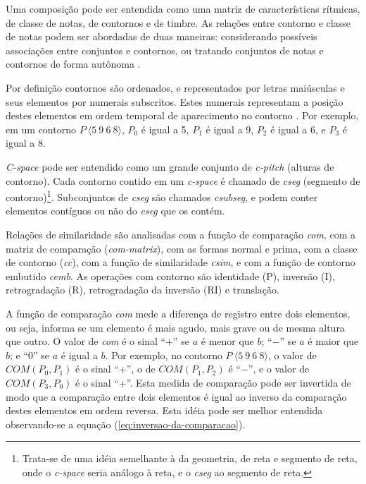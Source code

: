 \documentclass[brazil]{article}
\newcommand{\eng}[1]{\textit{#1}}
\begin{document}
Uma composição pode ser entendida como uma matriz de características
rítmicas, de classe de notas, de contornos e de timbre. As relações
entre contorno e classe de notas podem ser abordadas de duas maneiras:
considerando possíveis associações entre conjuntos e contornos, ou
tratando conjuntos de notas e contornos de forma autônoma
\cite{friedmann85:methodology}.

Por definição contornos são ordenados, e representados por letras
maiúsculas e seus elementos por numerais subscritos. Estes numerais
representam a posição destes elementos em ordem temporal de
aparecimento no contorno \cite{marvin.ea87:relating}. Por exemplo, em
um contorno $P\:\langle5\:9\:6\:8\rangle$, $P_0$ é igual a 5, $P_1$ é
igual a 9, $P_2$ é igual a 6, e $P_3$ é igual a 8.

\eng{C-space} pode ser entendido como um grande conjunto de
\eng{c-pitch} (alturas de contorno). Cada contorno contido em um
\eng{c-space} é chamado de \eng{cseg} (segmento de
contorno)\footnote{Trata-se de uma idéia semelhante à da geometria, de
  reta e segmento de reta, onde o \eng{c-space} seria análogo à reta,
  e o \eng{cseg} ao segmento de reta.}. Subconjuntos de \eng{cseg} são
chamados \eng{csubseg}, e podem conter elementos contíguos ou não do
\eng{cseg} que os contém.

Relações de similaridade \cite{marvin.ea87:relating} são analisadas
com a função de comparação \eng{com}, com a matriz de comparação
(\eng{com-matrix}), com as formas normal e prima, com a classe de
contorno (\eng{cc}), com a função de similaridade \eng{csim}, e com a
função de contorno embutido \eng{cemb}. As operações com contorno são
identidade (P), inversão (I), retrogradação (R), retrogradação da
inversão (RI) e translação.

A função de comparação \eng{com} mede a diferença de registro entre
dois elementos, ou seja, informa se um elemento é mais agudo, mais
grave ou de mesma altura que outro. O valor de \eng{com} é o sinal
``$+$'' se $a$ é menor que $b$; ``$-$'' se $a$ é maior que $b$; e
``$0$'' se $a$ é igual a $b$. Por exemplo, no contorno
$P\:\langle5\:9\:6\:8\rangle$, o valor de $COM(P_0,P_1)$ é o sinal
``$+$'', o de $COM(P_1,P_2)$ é ``$-$'', e o valor de $COM(P_3,P_0)$ é
o sinal ``$+$''. Esta medida de comparação pode ser invertida de modo
que a comparação entre dois elementos é igual ao inverso da comparação
destes elementos em ordem reversa. Esta idéia pode ser melhor
entendida observando-se a equação (\ref{eq:inversao-da-comparacao}).
\end{document}
